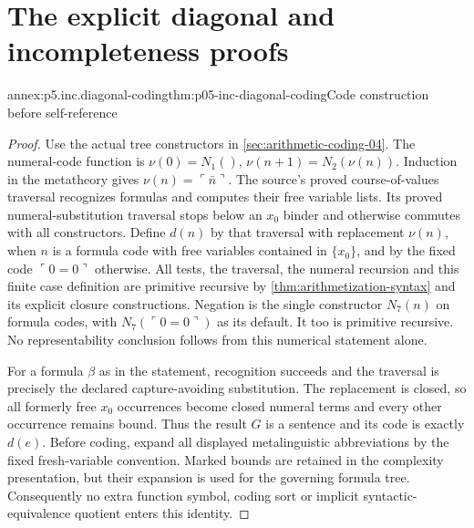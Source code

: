 \section{The explicit diagonal and incompleteness proofs}
\label{sec:annex-p05-inc}

\begin{annexitem}{annex:p5.inc.diagonal-coding}{thm:p05-inc-diagonal-coding}{Code construction before self-reference}
\begin{proof}
Use the actual tree constructors in \cref{sec:arithmetic-coding-04}.
The numeral-code function is \(\nu(0)=N_1()\),
\(\nu(n+1)=N_2(\nu(n))\). Induction in the metatheory gives
\(\nu(n)=\ulcorner\bar n\urcorner\). The source's proved
course-of-values traversal recognizes formulas and computes their free
variable lists. Its proved numeral-substitution traversal stops below
an \(x_0\) binder and otherwise commutes with all constructors. Define
\(d(n)\) by that traversal with replacement \(\nu(n)\), when
\(n\) is a formula code with free variables contained in \(\{x_0\}\),
and by the fixed code \(\ulcorner0=0\urcorner\) otherwise. All tests,
the traversal, the numeral recursion and this finite case definition are
primitive recursive by \cref{thm:arithmetization-syntax} and its explicit
closure constructions. Negation is the single constructor \(N_7(n)\)
on formula codes, with \(N_7(\ulcorner0=0\urcorner)\) as its default.
It too is primitive recursive. No representability conclusion follows
from this numerical statement alone.

For a formula \(\beta\) as in the statement, recognition succeeds and
the traversal is precisely the declared capture-avoiding substitution.
The replacement is closed, so all formerly free \(x_0\) occurrences
become closed numeral terms and every other occurrence remains bound.
Thus the result \(G\) is a sentence and its code is exactly \(d(e)\).
Before coding, expand all displayed metalinguistic abbreviations by the
fixed fresh-variable convention. Marked bounds are retained in the
complexity presentation, but their expansion is used for the governing
formula tree. Consequently no extra function symbol, coding sort or
implicit syntactic-equivalence quotient enters this identity.
\end{proof}
\end{annexitem}

